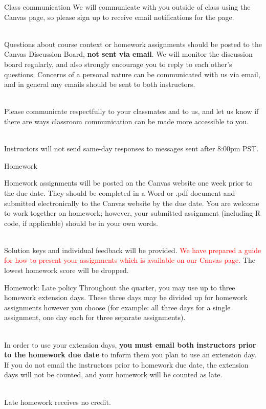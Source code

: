 \documentclass{beamer}
\begin{document}
\begin{frame}{Class communication}
We will communicate with you outside of class using the Canvas page, so please sign up to receive email notifications for the page. \\~\

Questions about course context or homework assignments should be posted to the Canvas Discussion Board, \textbf{not sent via email}. We will monitor the discussion board regularly, and also strongly encourage you to reply to each other’s questions. Concerns of a personal nature can be communicated with us via email, and in general any emails should be sent to both instructors. \\~\

Please communicate respectfully to your classmates and to us, and let us know if there are ways classroom communication can be made more accessible to you. \\~\

Instructors will not send same-day responses to messages sent after 8:00pm PST.
\end{frame}

\begin{frame}{Homework}

Homework assignments will be posted on the Canvas website one week 
prior to the due date. They should be completed in a Word or .pdf document and 
submitted electronically to the Canvas website by the due date. You are welcome to work together on homework; however, your submitted assignment (including R code, if applicable) should be in your own words. \\~\

Solution keys and individual feedback will be provided. \textcolor{red}{We have prepared a guide for how to present your assignments which is available on our Canvas page.} The lowest homework score will be dropped.

\end{frame}

\begin{frame}{Homework: Late policy}
Throughout the quarter, you may use up to three homework 
extension days. These three days may be divided up for homework assignments however you choose (for example: all three days for a single assignment, one day each for three separate assignments). \\~\

In order to use your extension days, \textbf{you must email both instructors prior to the homework due date} to inform them you plan to use an extension day. If you do not email the instructors prior to homework due date, the extension days will not be counted, and your homework will be counted as late. \\~\

Late homework receives no credit.

\end{frame}
\end{document}
